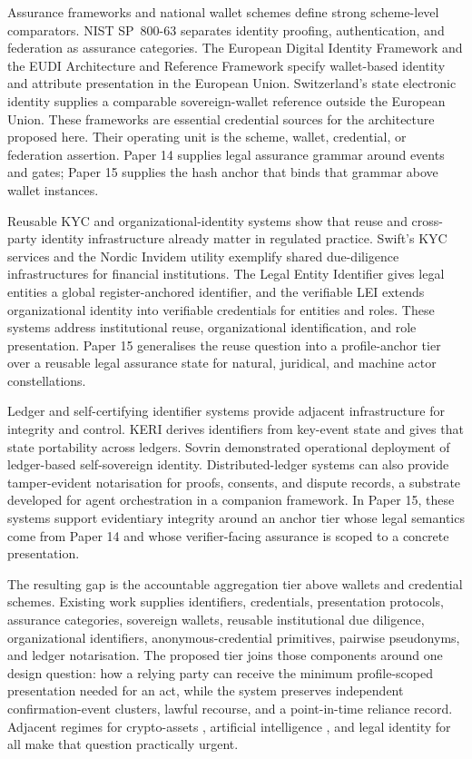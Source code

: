 \documentclass[oneside,10pt]{swissi}
\begin{document}
Assurance frameworks and national wallet schemes define strong scheme-level comparators. NIST SP~800-63 separates identity proofing, authentication, and federation as assurance categories.\cite{nist80063} The European Digital Identity Framework and the EUDI Architecture and Reference Framework specify wallet-based identity and attribute presentation in the European Union.\cite{eidas2024,eudiarf} Switzerland's state electronic identity supplies a comparable sovereign-wallet reference outside the European Union.\cite{swisseid} These frameworks are essential credential sources for the architecture proposed here. Their operating unit is the scheme, wallet, credential, or federation assertion. Paper 14 supplies legal assurance grammar around events and gates; Paper 15 supplies the hash anchor that binds that grammar above wallet instances.\cite{kurz2026actorassurance}

Reusable KYC and organizational-identity systems show that reuse and cross-party identity infrastructure already matter in regulated practice. Swift's KYC services and the Nordic Invidem utility exemplify shared due-diligence infrastructures for financial institutions.\cite{swift2026kycregistry,biia2020invidem} The Legal Entity Identifier gives legal entities a global register-anchored identifier, and the verifiable LEI extends organizational identity into verifiable credentials for entities and roles.\cite{gleif2025lei,gleif2024vlei} These systems address institutional reuse, organizational identification, and role presentation. Paper 15 generalises the reuse question into a profile-anchor tier over a reusable legal assurance state for natural, juridical, and machine actor constellations.

Ledger and self-certifying identifier systems provide adjacent infrastructure for integrity and control. KERI derives identifiers from key-event state and gives that state portability across ledgers.\cite{keri} Sovrin demonstrated operational deployment of ledger-based self-sovereign identity.\cite{sovrin} Distributed-ledger systems can also provide tamper-evident notarisation for proofs, consents, and dispute records, a substrate developed for agent orchestration in a companion framework.\cite{agnostyca2026} In Paper 15, these systems support evidentiary integrity around an anchor tier whose legal semantics come from Paper 14 and whose verifier-facing assurance is scoped to a concrete presentation.

The resulting gap is the accountable aggregation tier above wallets and credential schemes. Existing work supplies identifiers, credentials, presentation protocols, assurance categories, sovereign wallets, reusable institutional due diligence, organizational identifiers, anonymous-credential primitives, pairwise pseudonyms, and ledger notarisation. The proposed tier joins those components around one design question: how a relying party can receive the minimum profile-scoped presentation needed for an act, while the system preserves independent confirmation-event clusters, lawful recourse, and a point-in-time reliance record. Adjacent regimes for crypto-assets \cite{mica2023}, artificial intelligence \cite{aiact2024}, and legal identity for all \cite{unsdg169} make that question practically urgent.
\end{document}

